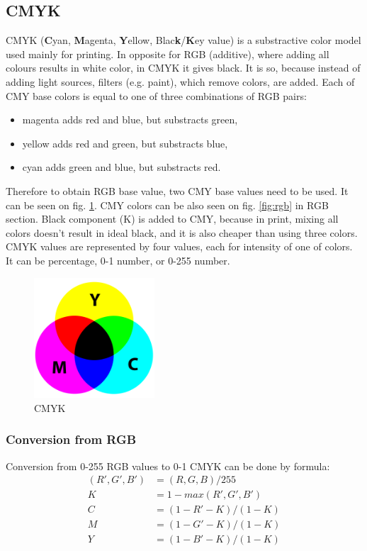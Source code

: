 \documentclass[titlepage]{article}
\begin{document}
\subsection{CMYK}
CMYK (\textbf{C}yan, \textbf{M}agenta, \textbf{Y}ellow,
Blac\textbf{k}/\textbf{K}ey value) is a substractive color model used mainly for
printing. In opposite for RGB (additive), where adding all colours results in
white color, in CMYK it gives black. It is so, because instead of adding light
sources, filters (e.g. paint), which remove colors, are added. Each of CMY base
colors is equal to one of three combinations of RGB pairs:
\begin{itemize}
  \item magenta adds red and blue, but substracts green,
  \item yellow adds red and green, but substracts blue,
  \item cyan adds green and blue, but substracts red.
\end{itemize}
Therefore to obtain RGB base value, two CMY base values need to be used. It can
be seen on fig. \ref{fig:cmyk}. CMY colors can be also seen on fig.
\ref{fig:rgb} in RGB section. Black component (K) is added to CMY, because in
print, mixing all colors doesn't result in ideal black, and it is also cheaper than using three colors. CMYK values are represented by four values, each for
intensity of one of colors. It can be percentage, 0-1 number, or 0-255 number.

\begin{figure}[!htb]
	\centering
	\includegraphics[width=0.4\textwidth]{img/CMYK.png}
	\caption{CMYK} 
	\label{fig:cmyk}
\end{figure}

\subsubsection{Conversion from RGB}
Conversion from 0-255 RGB values to 0-1 CMYK can be done by formula:
\begin{equation}
\begin{split}
(R', G', B') &= (R, G, B)/255 \\
K&=1-max(R', G', B')\\
C&=(1-R'-K)/(1-K)\\
M&=(1-G'-K)/(1-K)\\
Y&=(1-B'-K)/(1-K)
\end{split}
\end{equation}
\end{document}
